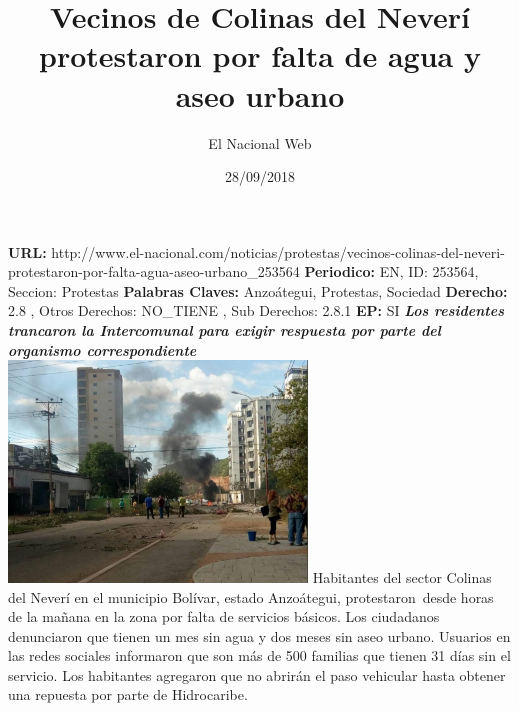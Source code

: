 \documentclass{article}%
\title{\textbf{Vecinos de Colinas del Neverí protestaron por falta de agua y aseo urbano}}%
\author{El Nacional Web}%
\date{28/09/2018}%
\begin{document}
%
\normalsize%
\maketitle%
\textbf{URL: }%
http://www.el{-}nacional.com/noticias/protestas/vecinos{-}colinas{-}del{-}neveri{-}protestaron{-}por{-}falta{-}agua{-}aseo{-}urbano\_253564\newline%
%
\textbf{Periodico: }%
EN, %
ID: %
253564, %
Seccion: %
Protestas\newline%
%
\textbf{Palabras Claves: }%
Anzoátegui, Protestas, Sociedad\newline%
%
\textbf{Derecho: }%
2.8%
, Otros Derechos: %
NO\_TIENE%
, Sub Derechos: %
2.8.1%
\newline%
%
\textbf{EP: }%
SI\newline%
\newline%
%
\textbf{\textit{Los residentes trancaron la Intercomunal para exigir respuesta por parte del organismo correspondiente ~}}%
\newline%
\newline%
%
\includegraphics[width=300px]{154.jpg}%
\newline%
%
Habitantes del sector Colinas del Neverí en el municipio Bolívar, estado Anzoátegui, protestaron~desde horas de la mañana en la zona por falta de servicios básicos.%
\newline%
%
Los ciudadanos denunciaron que tienen un mes sin agua y dos meses sin aseo urbano. Usuarios en las redes sociales informaron que son más de 500 familias que tienen 31 días sin el servicio.%
\newline%
%
Los habitantes agregaron que no abrirán el paso vehicular hasta obtener una repuesta por parte de Hidrocaribe.%
\newline%
%
\end{document}
